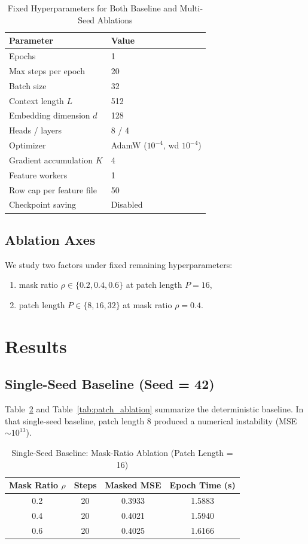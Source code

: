 \documentclass[journal]{IEEEtran}
\begin{document}
\begin{table}[t]
\caption{Fixed Hyperparameters for Both Baseline and Multi-Seed Ablations}
\label{tab:fixed_hparams}
\centering
\begin{tabular}{ll}
\toprule
Parameter & Value \\
\midrule
Epochs & 1 \\
Max steps per epoch & 20 \\
Batch size & 32 \\
Context length $L$ & 512 \\
Embedding dimension $d$ & 128 \\
Heads / layers & 8 / 4 \\
Optimizer & AdamW ($10^{-4}$, wd $10^{-4}$) \\
Gradient accumulation $K$ & 4 \\
Feature workers & 1 \\
Row cap per feature file & 50 \\
Checkpoint saving & Disabled \\
\bottomrule
\end{tabular}
\end{table}

\subsection{Ablation Axes}
We study two factors under fixed remaining hyperparameters:
\begin{enumerate}
    \item mask ratio $\rho \in \{0.2, 0.4, 0.6\}$ at patch length $P=16$,
    \item patch length $P \in \{8, 16, 32\}$ at mask ratio $\rho=0.4$.
\end{enumerate}

\section{Results}
\subsection{Single-Seed Baseline (Seed = 42)}
Table~\ref{tab:mask_ablation} and Table~\ref{tab:patch_ablation} summarize the deterministic baseline. In that single-seed baseline, patch length 8 produced a numerical instability (MSE $\sim 10^{13}$).

\begin{table}[t]
\caption{Single-Seed Baseline: Mask-Ratio Ablation (Patch Length = 16)}
\label{tab:mask_ablation}
\centering
\begin{tabular}{cccc}
\toprule
Mask Ratio $\rho$ & Steps & Masked MSE & Epoch Time (s) \\
\midrule
0.2 & 20 & 0.3933 & 1.5883 \\
0.4 & 20 & 0.4021 & 1.5940 \\
0.6 & 20 & 0.4025 & 1.6166 \\
\bottomrule
\end{tabular}
\end{table}
\end{document}
